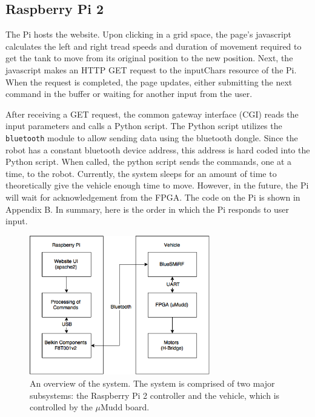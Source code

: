 \documentclass[11pt]{article}
\begin{document}
\subsection{Raspberry Pi 2}
The Pi hosts the website. Upon clicking in a grid space, the page's javascript calculates the left and right tread speeds and duration of movement required to get the tank to move from its original position to the new position. Next, the javascript makes an HTTP GET request to the inputChars resource of the Pi. When the request is completed, the page updates, either submitting the next command in the buffer or waiting for another input from the user.

After receiving a GET request, the common gateway interface (CGI) reads the input parameters and calls a Python script. The Python script utilizes the \verb.bluetooth. module to allow sending data using the bluetooth dongle. Since the robot has a constant bluetooth device address, this address is hard coded into the Python script. When called, the python script sends the commands, one at a time, to the robot. Currently, the system sleeps for an amount of time to theoretically give the vehicle enough time to move. However, in the future, the Pi will wait for acknowledgement from the FPGA. The code on the Pi is shown in Appendix B. In summary, here is the order in which the Pi responds to user input.

\begin{figure}
\begin{center}
\includegraphics[width=0.7\textwidth]{E155System}
\end{center}
\caption{An overview of the system. The system is comprised of two major subsystems: the Raspberry Pi 2 controller and the vehicle, which is controlled by the $\mu$Mudd board.}
\label{fig:sys}
\end{figure}
\end{document}
